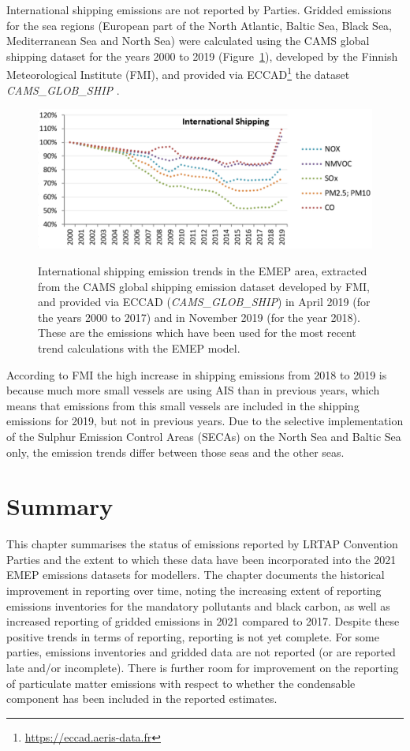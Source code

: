 International shipping emissions are not reported by Parties. Gridded emissions for the sea regions (European part of the North Atlantic, Baltic Sea, Black Sea, Mediterranean Sea and North Sea) were calculated using the CAMS global shipping dataset \citep{CAMSemis2019} for the years 2000 to 2019 (Figure~\ref{fig:CEIP10}), developed by the Finnish Meteorological Institute (FMI), and provided via ECCAD\footnote{\url{https://eccad.aeris-data.fr}} the dataset {\it CAMS\_GLOB\_SHIP} \citep{ECCAD}.

\begin{figure}[h]
\centering
{\includegraphics*[viewport=1 1 553 230,clip,width=0.75\linewidth]{FIGS_CEIP/Fig10.pdf}}
\caption{International shipping emission trends in the EMEP area, extracted from the CAMS global shipping emission dataset developed by FMI, and provided via ECCAD ({\it CAMS\_GLOB\_SHIP}) in April 2019 (for the years 2000 to 2017) and in November 2019 (for the year 2018). These are the emissions which have been used for the most recent trend calculations with the EMEP model.
}
\label{fig:CEIP10}
\end{figure}


According to FMI the high increase in shipping emissions from 2018 to 2019 is because much more small vessels are using AIS than in previous years, which means that emissions from this small vessels are included in the shipping emissions for 2019, but not in previous years.
Due to the selective implementation of the Sulphur Emission Control Areas (SECAs) on the North Sea and Baltic Sea only, the emission trends differ between those seas and the other seas.



\section{Summary}

This chapter summarises the status of emissions reported by LRTAP Convention Parties and the extent to which these data have been incorporated into the 2021 EMEP emissions datasets for modellers. The chapter documents the historical improvement in reporting over time, noting the increasing extent of reporting emissions inventories for the mandatory pollutants and black carbon, as well as increased reporting of gridded emissions in 2021 compared to 2017. Despite these positive trends in terms of reporting, reporting is not yet complete. For some parties, emissions inventories and gridded data are not reported (or are reported late and/or incomplete). There is further room for improvement on the reporting of particulate matter emissions with respect to whether the condensable component has been included in the reported estimates.

